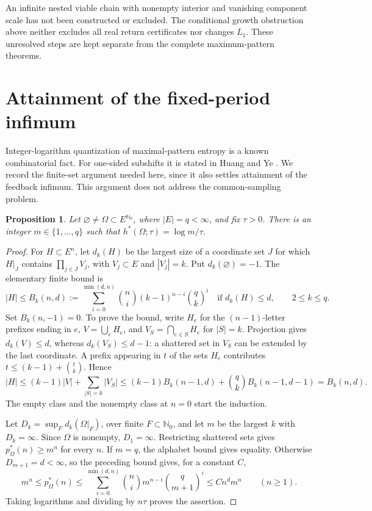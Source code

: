\documentclass[11pt,reqno]{amsart}
\numberwithin{equation}{section}
\newtheorem{proposition}[theorem]{Proposition}
\theoremstyle{definition}
\newcommand{\Nzero}{\mathbb N_0}
\newcommand{\hpat}{h^{*}}
\begin{document}
An infinite nested viable chain with nonempty interior and vanishing
component scale has not been constructed or excluded. The conditional
growth obstruction above neither excludes all real return certificates
nor changes $L_1$. These unresolved steps are kept separate from
the complete maximum-pattern theorems.

\section{Attainment of the fixed-period infimum}\label{app:minimum}

Integer-logarithm quantization of maximal-pattern entropy is a known
combinatorial fact. For one-sided subshifts it is stated in
Huang and Ye \cite[Theorem~5.5]{HuangYe2009}. We record the finite-set
argument needed here, since it also settles attainment of the feedback
infimum. This argument does not address the common-sampling problem.

\begin{proposition}\label{prop:quantization}
Let $\varnothing\ne\Omega\subset E^{\Nzero}$, where $|E|=q<\infty$,
and fix $\tau>0$. There is an integer $m\in\{1,\ldots,q\}$ such that
$\hpat(\Omega;\tau)=\log m/\tau$.
\end{proposition}
\begin{proof}
For $H\subset E^n$, let $d_k(H)$ be the largest size of a coordinate
set $J$ for which $H|_J$ contains $\prod_{j\in J}V_j$, with
$V_j\subset E$ and $|V_j|=k$. Put $d_k(\varnothing)=-1$.
The elementary finite bound is
\[
 |H|\le B_k(n,d):=
 \sum_{i=0}^{\min(d,n)}\binom ni(k-1)^{n-i}\binom qk^i
 \quad\text{if }d_k(H)\le d,\qquad 2\le k\le q.
\]
Set $B_k(n,-1)=0$. To prove the bound, write $H_e$ for the
$(n-1)$-letter prefixes ending in $e$, $V=\bigcup_eH_e$, and
$V_S=\bigcap_{e\in S}H_e$ for $|S|=k$. Projection gives
$d_k(V)\le d$, whereas $d_k(V_S)\le d-1$: a shattered set in
$V_S$ can be extended by the last coordinate. A prefix appearing
in $t$ of the sets $H_e$ contributes
$t\le(k-1)+\binom tk$. Hence
\[
 |H|\le(k-1)|V|+\sum_{|S|=k}|V_S|
 \le(k-1)B_k(n-1,d)+\binom qk B_k(n-1,d-1)
 =B_k(n,d).
\]
The empty class and the nonempty class at $n=0$ start the induction.

Let $D_k=\sup_Fd_k(\Omega|_F)$, over finite $F\subset\Nzero$,
and let $m$ be the largest $k$ with $D_k=\infty$.
Since $\Omega$ is nonempty, $D_1=\infty$.
Restricting shattered sets gives $p_\Omega^*(n)\ge m^n$ for every
$n$. If $m=q$, the alphabet bound gives equality. Otherwise
$D_{m+1}=d<\infty$, so the preceding bound gives, for a constant $C$,
\[
 m^n\le p_\Omega^*(n)
 \le\sum_{i=0}^{\min(d,n)}\binom ni m^{n-i}\binom q{m+1}^i
 \le C n^d m^n\qquad(n\ge1).
\]
Taking logarithms and dividing by $n\tau$ proves the assertion.
\end{proof}
\end{document}
